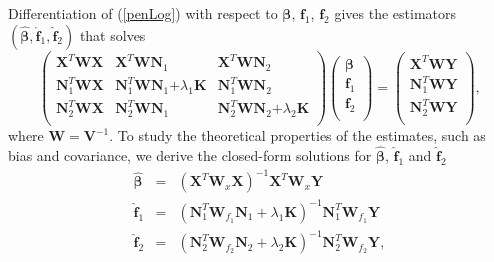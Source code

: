 \documentclass[review]{elsarticle}
\begin{document}
Differentiation of (\ref{penLog}) with respect to $\boldsymbol \beta$, $\boldsymbol f_1$, $\boldsymbol f_2$ gives the estimators 
$(\boldsymbol {\hat \beta}, \boldsymbol {\hat f}_1, \boldsymbol {\hat f}_2)$ that solves
\begin{equation} \label{normalMatrix}
 \begin{pmatrix}
  \boldsymbol X^T  \boldsymbol W \boldsymbol X & \boldsymbol X^T  \boldsymbol W \boldsymbol N_1 & \boldsymbol X^T  \boldsymbol W \boldsymbol N_2 \\
   \boldsymbol N_1^T  \boldsymbol W\boldsymbol X & \boldsymbol N_1^T  \boldsymbol W \boldsymbol N_1 \boldsymbol 
 + \lambda_1 \boldsymbol K &  \boldsymbol N_1^T  \boldsymbol W \boldsymbol N_2  \\
  \boldsymbol N_2^T  \boldsymbol W\boldsymbol X &  \boldsymbol N_2^T  \boldsymbol W \boldsymbol N_1 & \boldsymbol N_2^T  \boldsymbol W \boldsymbol N_2 \boldsymbol 
 +
  \lambda_2 \boldsymbol K \\
 \end{pmatrix}
  \begin{pmatrix}
   \boldsymbol \beta \\
 \boldsymbol f_1 \\
 \boldsymbol f_2\\
 \end{pmatrix}
  =
 \begin{pmatrix}
   \boldsymbol X^T  \boldsymbol W \boldsymbol Y \\
   \boldsymbol N_1^T  \boldsymbol W \boldsymbol Y  \\
  \boldsymbol N_2^T  \boldsymbol W \boldsymbol Y  \\
 \end{pmatrix},
 \end{equation}
where $\boldsymbol W = \boldsymbol V^{-1}$.
To study the theoretical properties of the estimates, such as bias and covariance, we derive the closed-form solutions  for $\boldsymbol {\hat \beta}$, $\boldsymbol {\hat f}_1$ and $\boldsymbol {\hat f}_2$
\begin{eqnarray}
 \boldsymbol {\hat \beta} 
  &=&
 (\boldsymbol X^T  \boldsymbol W_x \boldsymbol X )^{-1} \boldsymbol X^T  \boldsymbol W_x \boldsymbol Y 
\label{betaHat} \\
 \boldsymbol {\hat f}_1
   &=&
  (\boldsymbol N_1^T 
\boldsymbol W_{f_1}  \boldsymbol N_1
  + \lambda_1 \boldsymbol K)^{-1}  \boldsymbol N_1^T \boldsymbol W_{f_1} \boldsymbol Y
\label{f1Hat} \\
  \boldsymbol {\hat f}_2 
  &=&
 (\boldsymbol N_2^T 
\boldsymbol W_{f_2}  \boldsymbol N_2
  + \lambda_2 \boldsymbol K)^{-1}  \boldsymbol N_2^T \boldsymbol W_{f_2} \boldsymbol Y,
\label{f2Hat}
\end{eqnarray}
\end{document}
